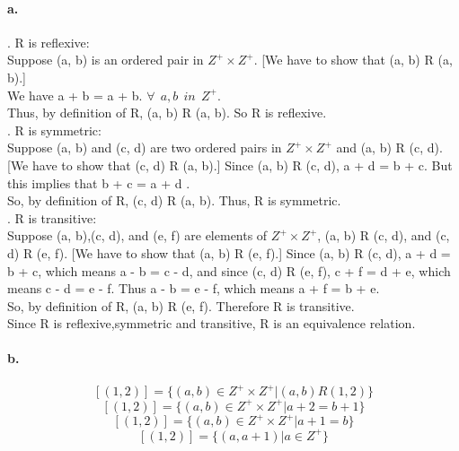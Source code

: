 \documentclass[11pt]{article}
\begin{document}
\paragraph{a.}
.\newline
R is reflexive:\\
Suppose (a, b) is an ordered pair in $Z^+ \times Z^+$. [We have to show that (a, b) R (a, b).]\\
We have a + b = a + b. $\forall\ \ a,b\ \ in\ \ Z^+$.\\ Thus, by definition of R, (a, b) R (a, b). So R is reflexive.\\
.\newline
R is symmetric:\\
Suppose (a, b) and (c, d) are two ordered pairs in $Z^+ \times Z^+$ and (a, b) R (c, d). [We have to show that (c, d) R (a, b).] Since (a, b) R (c, d), a + d = b + c. But this implies that b + c = a + d .\\ 
So, by definition of R, (c, d) R (a, b). Thus, R is symmetric.\\
.\newline
R is transitive:\\
Suppose (a, b),(c, d), and (e, f) are elements of $Z^+ \times Z^+$, (a, b) R (c, d), and (c, d) R (e, f). [We have to show that (a, b) R (e, f).] Since (a, b) R (c, d), a + d = b + c, which means a - b = c - d, and since (c, d) R (e, f), c + f = d + e, which means c - d = e - f. Thus a - b = e - f, which means a + f = b + e.\\
So, by definition of R, (a, b) R (e, f). Therefore R is transitive.\\
Since R is reflexive,symmetric and transitive, R is an equivalence relation.
\paragraph{b.}
$$
[(1,2)] = \{(a,b) \in Z^+ \times Z^+ | (a,b) R (1,2)\}
$$
$$
[(1,2)] = \{(a,b) \in Z^+ \times Z^+ | a+2 = b+1\}
$$
$$
[(1,2)] = \{(a,b) \in Z^+ \times Z^+ | a+1 = b\}
$$
$$
[(1,2)] = \{(a,a+1) | a \in Z^+\}
$$
\end{document}
